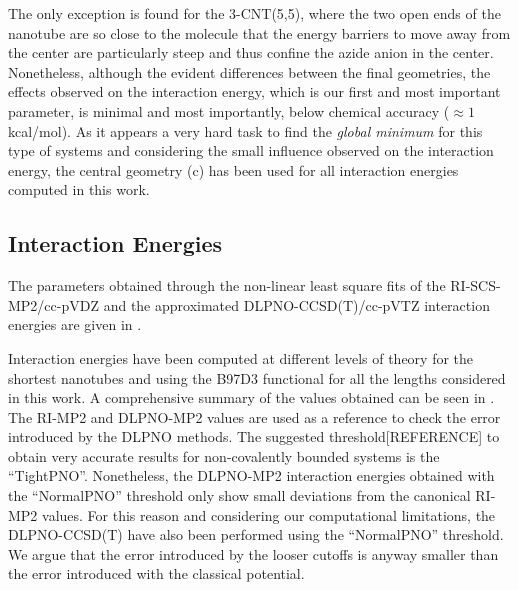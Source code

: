 \documentclass[utf8]{article}
\begin{document}
The only exception is found for the 3-CNT(5,5), where the two open ends of the nanotube are so close to the \ntm molecule that the energy barriers to move away from the center are particularly steep and thus confine the azide anion in the center.\\
Nonetheless, although the evident differences between the final geometries, the effects observed on the interaction energy, which is our first and most important parameter, is minimal and most importantly, below chemical accuracy ($\approx 1$ kcal/mol).
As it appears a very hard task to find the \emph{global minimum} for this type of systems and considering the small influence observed on the interaction energy, the central geometry (c) has been used for all interaction energies computed in this work.

\subsection{Interaction Energies}
The parameters obtained through the non-linear least square fits of the RI-SCS-MP2/cc-pVDZ and the approximated DLPNO-CCSD(T)/cc-pVTZ interaction energies are given in .

Interaction energies have been computed at different levels of theory for the shortest nanotubes and using the B97D3 functional for all the lengths considered in this work. A comprehensive summary of the values obtained can be seen in .\\
The RI-MP2 and DLPNO-MP2 values are used as a reference to check the error introduced by the DLPNO methods.
The suggested threshold[REFERENCE] to obtain very accurate results for non-covalently bounded systems is the ``TightPNO''. Nonetheless, the DLPNO-MP2 interaction energies obtained with the ``NormalPNO'' threshold only show small deviations from the canonical RI-MP2 values. For this reason and considering our computational limitations, the DLPNO-CCSD(T) have also been performed using the ``NormalPNO'' threshold.
We argue that the error introduced by the looser cutoffs is anyway smaller than the error introduced with the classical potential.
\end{document}

